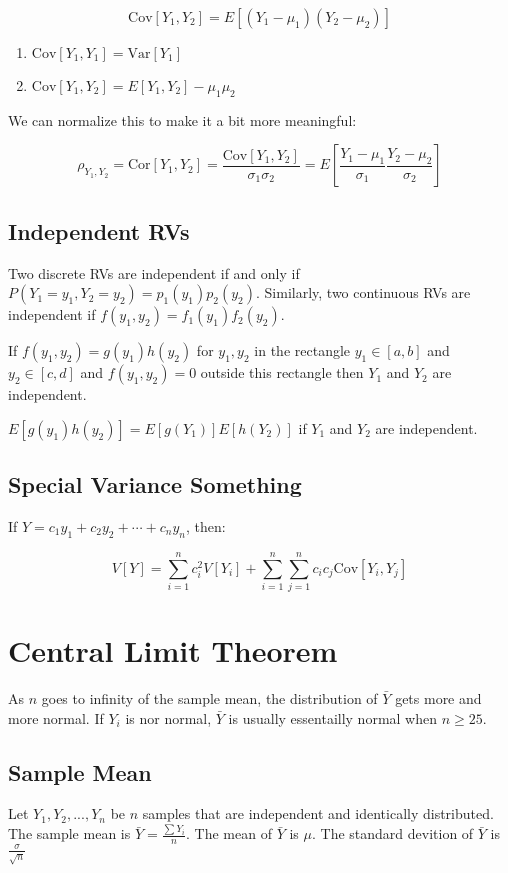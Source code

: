 \documentclass{article}
\begin{document}
\[ \text{Cov}[Y_1, Y_2] = E[(Y_1 - \mu_1)(Y_2 - \mu_2)] \]

\begin{enumerate}
  \item $\text{Cov}[Y_1, Y_1] = \text{Var}[Y_1]$
  \item $\text{Cov}[Y_1, Y_2] = E[Y_1,Y_2] - \mu_1\mu_2$
\end{enumerate}

We can normalize this to make it a bit more meaningful:

\[
\rho_{Y_1,Y_2} = \text{Cor}[Y_1,Y_2] =
\frac{\text{Cov}[Y_1,Y_2]}{\sigma_1\sigma_2} = E[\frac{Y_1 -
\mu_1}{\sigma_1}\frac{Y_2 - \mu_2}{\sigma_2}]
\]
\subsection{Independent RVs}
Two discrete RVs are independent if and only if
$P(Y_1=y_1,Y_2=y_2)=p_1(y_1)p_2(y_2)$. Similarly, two continuous RVs are
independent if $f(y_1,y_2) = f_1(y_1)f_2(y_2)$.

If $f(y_1,y_2) = g(y_1)h(y_2)$ for $y_1, y_2$ in the rectangle $y_1\in[a,b]$
and $y_2\in[c,d]$ and $f(y_1,y_2) = 0$ outside this rectangle then $Y_1$ and
$Y_2$ are independent.

$E[g(y_1)h(y_2)] = E[g(Y_1)]E[h(Y_2)]$ if $Y_1$ and $Y_2$ are independent.

\subsection{Special Variance Something}
If $Y=c_1y_1 + c_2y_2 + \cdots + c_ny_n$, then:

\[ V[Y] = \sum_{i=1}^{n}c_i^2V[Y_i] +
\sum_{i=1}^{n}\sum_{j=1}^{n} c_i c_j \text{Cov}[Y_i,Y_j]\]

\section{Central Limit Theorem}
As $n$ goes to infinity of the sample mean, the distribution of $\bar{Y}$ gets
more and more normal. If $Y_i$ is nor normal, $\bar{Y}$ is usually essentailly
normal when $n \geq 25$.

\subsection{Sample Mean}
Let $Y_1,Y_2,...,Y_n$ be $n$ samples that are independent and identically
distributed. The sample mean is $\bar{Y} = \frac{\sum Y_i}{n}$. The mean of
$\bar{Y}$ is $\mu$. The standard devition of $\bar{Y}$ is
$\frac{\sigma}{\sqrt{n}}$
\end{document}
